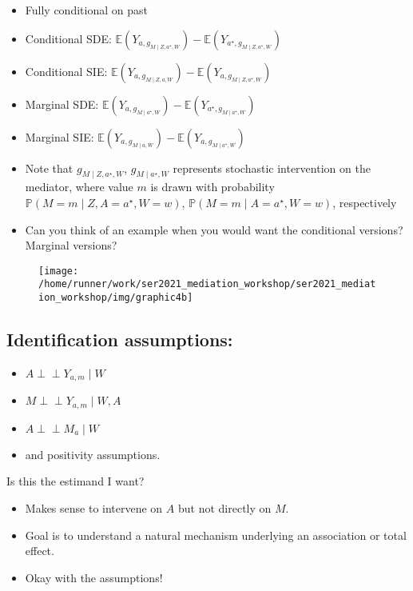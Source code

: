 \documentclass[
  12pt,
]{book}
\providecommand{\tightlist}{%
  \setlength{\itemsep}{0pt}\setlength{\parskip}{0pt}}
\theoremstyle{definition}
\theoremstyle{definition}
\theoremstyle{definition}
\newcommand{\indep}{\mbox{$\perp\!\!\!\perp$}}
\renewcommand{\P}{\mathbb{P}}
\newcommand{\E}{\mathbb{E}}
\newcommand{\1}{\mathbbm{1}}
\begin{document}
\begin{itemize}
\tightlist
\item
  Fully conditional on past
\item
  Conditional SDE: \(\E(Y_{a, g_{M \mid Z, a^{\star}, W}}) - \E(Y_{a^{\star}, g_{M \mid Z, a^{\star}, W}})\)
\item
  Conditional SIE: \(\E(Y_{a, g_{M \mid Z, a, W}}) - \E(Y_{a, g_{M \mid Z, a^{\star}, W}})\)
\item
  Marginal SDE: \(\E(Y_{a, g_{M \mid a^{\star}, W}}) - \E(Y_{a^{\star}, g_{M \mid a^{\star}, W}})\)
\item
  Marginal SIE: \(\E(Y_{a, g_{M \mid a, W}}) - \E(Y_{a, g_{M \mid a^{\star}, W}})\)
\item
  Note that \(g_{M \mid Z, a^{\star}, W}\), \(g_{M \mid a^{\star}, W}\) represents
  stochastic intervention on the mediator, where value \(m\) is drawn with
  probability \(\P(M = m \mid Z, A = a^{\star}, W = w)\),
  \(\P(M = m \mid A = a^{\star}, W = w)\), respectively
\item
  Can you think of an example when you would want the conditional versions?
  Marginal versions?
\end{itemize}

\begin{figure}

{\centering \texttt{[image: /home/runner/work/ser2021\_mediation\_workshop/ser2021\_mediation\_workshop/img/graphic4b]} 

}

\end{figure}

\hypertarget{identification-assumptions-2}{%
\subsection{Identification assumptions:}\label{identification-assumptions-2}}

\begin{itemize}
\tightlist
\item
  \(A \indep Y_{a,m} \mid W\)
\item
  \(M \indep Y_{a,m} \mid W, A\)
\item
  \(A \indep M_a \mid W\)
\item
  and positivity assumptions.
\end{itemize}

Is this the estimand I want?

\begin{itemize}
\tightlist
\item
  Makes sense to intervene on \(A\) but not directly on \(M\).
\item
  Goal is to understand a natural mechanism underlying an association or total
  effect.
\item
  Okay with the assumptions!
\end{itemize}
\end{document}
